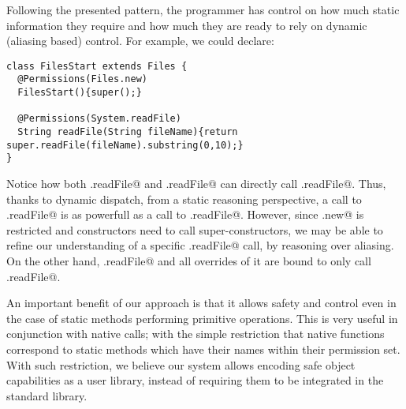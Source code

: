 \documentclass[a4paper,twoside,british,9pt]{extarticle}
\begin{document}
 Following the
presented pattern, the programmer has control on how much static information
they require and how much they are ready to rely on dynamic (aliasing
based) control. For example, we could declare:
\vspace{-1ex}
\begin{lstlisting}
class FilesStart extends Files {
  @Permissions(Files.new)
  FilesStart(){super();}

  @Permissions(System.readFile)
  String readFile(String fileName){return super.readFile(fileName).substring(0,10);}
}
\end{lstlisting}
\vspace{-1ex}
Notice how both \Q@Files.readFile@
and \Q@FilesStart.readFile@
can directly call \Q@System.readFile@.
Thus, thanks to dynamic dispatch, from a static reasoning perspective, a call to
\Q@Files.readFile@ is as powerfull as a call
to \Q@System.readFile@.
However, since \Q@Files.new@ is restricted and
constructors need to call super-constructors, we may be able to refine our understanding of a specific  
\Q@Files.readFile@ call, by reasoning over aliasing.
On the other hand, \Q@DocFiles.readFile@ and all overrides of it are bound to
only call \Q@Documents.readFile@.

An important benefit of our approach is that it allows safety and
control even in the case of static methods performing primitive operations.
This is very useful in conjunction with native calls; with the simple restriction
that native functions correspond to static methods which have their names within their permission set.
With such restriction, we believe our system allows encoding safe object capabilities as
a user library, instead of requiring them to be integrated in the
standard library. 
\end{document}
